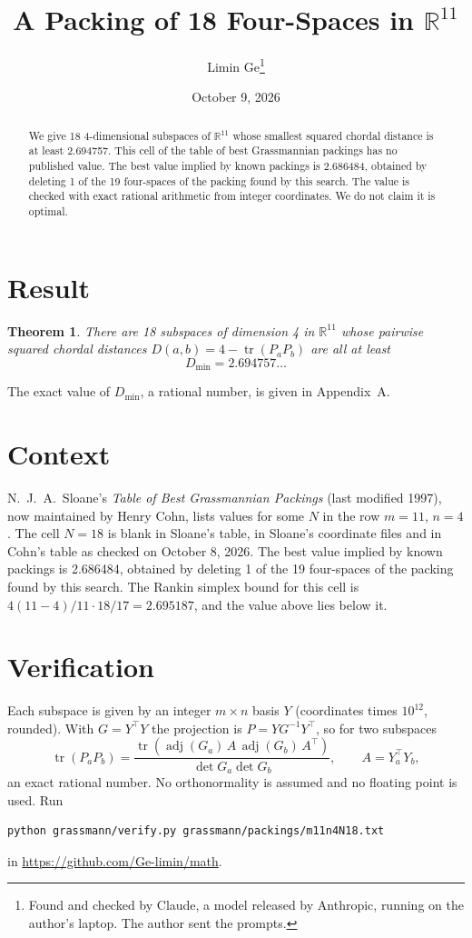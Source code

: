 \documentclass[11pt,a4paper]{article}
\title{A Packing of 18 Four-Spaces in $\mathbb{R}^{11}$}
\author{Limin Ge\thanks{Found and checked by Claude, a model released by Anthropic, running on the author's laptop. The author sent the prompts.}}
\date{October 9, 2026}
\newtheorem*{theorem}{Theorem}
\begin{document}
\maketitle
\begin{abstract}
We give 18 4-dimensional subspaces of $\mathbb{R}^{11}$ whose smallest squared chordal distance is at least 2.694757. This cell of the table of best Grassmannian packings has no published value. The best value implied by known packings is 2.686484, obtained by deleting 1 of the 19 four-spaces of the packing found by this search. The value is checked with exact rational arithmetic from integer coordinates. We do not claim it is optimal.
\end{abstract}

\section{Result}
\begin{theorem}
There are 18 subspaces of dimension 4 in $\mathbb{R}^{11}$ whose pairwise squared chordal distances $D(a,b) = 4 - \operatorname{tr}(P_aP_b)$ are all at least
\[ D_{\min} = 2.694757\ldots \]
\end{theorem}
The exact value of $D_{\min}$, a rational number, is given in Appendix~A.


\section{Context}
N.~J.~A.~Sloane's \emph{Table of Best Grassmannian Packings} (last modified 1997), now maintained by Henry Cohn, lists values for some $N$ in the row $m=11$, $n=4$. The cell $N=18$ is blank in Sloane's table, in Sloane's coordinate files and in Cohn's table as checked on October 8, 2026. The best value implied by known packings is 2.686484, obtained by deleting 1 of the 19 four-spaces of the packing found by this search. The Rankin simplex bound for this cell is $4(11-4)/11\cdot 18/17 = 2.695187$, and the value above lies below it.


\section{Verification}
Each subspace is given by an integer $m\times n$ basis $Y$ (coordinates times $10^{12}$, rounded). With $G=Y^\top Y$ the projection is $P=YG^{-1}Y^\top$, so for two subspaces
\[ \operatorname{tr}(P_aP_b)=\frac{\operatorname{tr}(\operatorname{adj}(G_a)\,A\,\operatorname{adj}(G_b)\,A^\top)}{\det G_a\det G_b},\qquad A=Y_a^\top Y_b, \]
an exact rational number. No orthonormality is assumed and no floating point is used. Run
\begin{verbatim}
python grassmann/verify.py grassmann/packings/m11n4N18.txt
\end{verbatim}
in \url{https://github.com/Ge-limin/math}.
\end{document}
